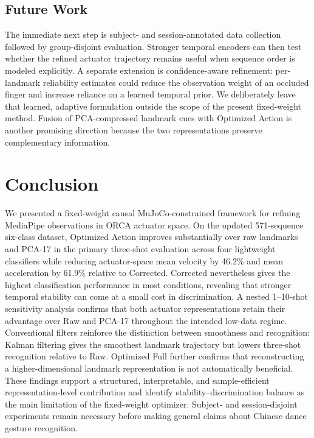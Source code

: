 \documentclass[11pt]{article}
\begin{document}
\subsection{Future Work}
The immediate next step is subject- and session-annotated data collection followed by group-disjoint evaluation. Stronger temporal encoders can then test whether the refined actuator trajectory remains useful when sequence order is modeled explicitly. A separate extension is confidence-aware refinement: per-landmark reliability estimates could reduce the observation weight of an occluded finger and increase reliance on a learned temporal prior. We deliberately leave that learned, adaptive formulation outside the scope of the present fixed-weight method. Fusion of PCA-compressed landmark cues with Optimized Action is another promising direction because the two representations preserve complementary information.

\section{Conclusion}
We presented a fixed-weight causal MuJoCo-constrained framework for refining MediaPipe observations in ORCA actuator space. On the updated 571-sequence six-class dataset, Optimized Action improves substantially over raw landmarks and PCA-17 in the primary three-shot evaluation across four lightweight classifiers while reducing actuator-space mean velocity by 46.2\% and mean acceleration by 61.9\% relative to Corrected. Corrected nevertheless gives the highest classification performance in most conditions, revealing that stronger temporal stability can come at a small cost in discrimination. A nested 1--10-shot sensitivity analysis confirms that both actuator representations retain their advantage over Raw and PCA-17 throughout the intended low-data regime. Conventional filters reinforce the distinction between smoothness and recognition: Kalman filtering gives the smoothest landmark trajectory but lowers three-shot recognition relative to Raw. Optimized Full further confirms that reconstructing a higher-dimensional landmark representation is not automatically beneficial. These findings support a structured, interpretable, and sample-efficient representation-level contribution and identify stability--discrimination balance as the main limitation of the fixed-weight optimizer. Subject- and session-disjoint experiments remain necessary before making general claims about Chinese dance gesture recognition.

\appendix
\end{document}
